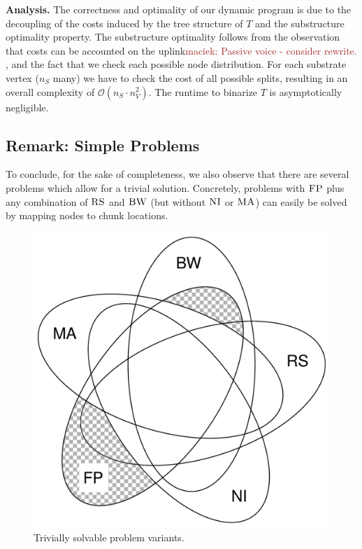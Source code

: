 \documentclass[9pt]{sigcomm-alternate}
\newcommand{\maciek}[1]{\textcolor{brown}{maciek: #1}}
\newcommand{\CC}{\textsc{NI}}
\newcommand{\FP}{\textsc{FP}}
\newcommand{\RS}{\textsc{RS}}
\newcommand{\BW}{\textsc{BW}}
\newcommand{\MA}{\textsc{MA}}
\newcommand{\Tree}{\ensuremath{T}}
\begin{document}
\textbf{Analysis.}
The correctness and optimality of our dynamic program
is due to the decoupling of the costs induced by the tree
structure of $\Tree$ and the  substructure
optimality property.
The substructure optimality follows from the observation that
costs can be accounted on the uplink\maciek{Passive voice - consider rewrite.}
, and the fact
 that we check each possible node distribution.
For each substrate vertex ($n_S$ many) we have
to check the cost of all possible splits,
resulting in an overall complexity of $\mathcal{O}(n_S \cdot n_V^2)$.
The runtime to binarize $\Tree$ is asymptotically negligible.


\subsection{Remark: Simple Problems}

To conclude, for the sake of completeness, we also observe that there are
several problems which
allow for a trivial solution. Concretely, problems with $\FP$
plus any combination of
$\RS$ and $\BW$ (but without $\CC$ or $\MA$) can easily be solved by mapping nodes to chunk locations.

\begin{figure}
\includegraphics[width=0.48\columnwidth]{figs/venn_trivial.pdf}
\caption{Trivially solvable problem variants.}
\label{fig:venn_trivial}
\end{figure}
\end{document}
